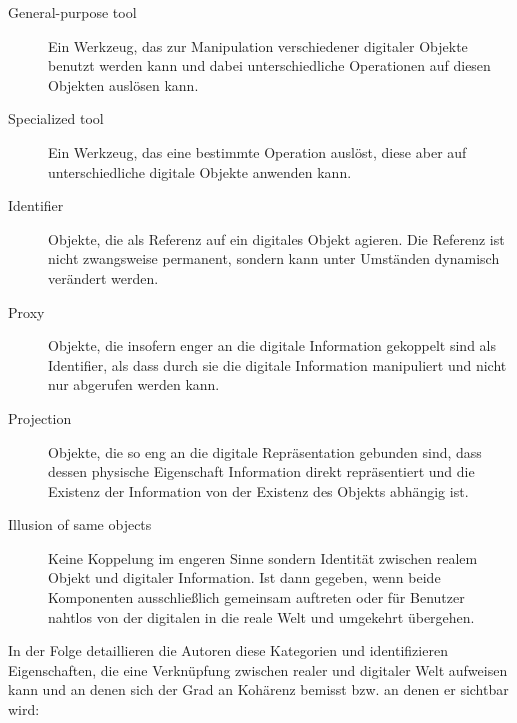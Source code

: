 \begin{description}
	\item[General-purpose tool] Ein Werkzeug, das zur Manipulation verschiedener digitaler Objekte benutzt werden kann und dabei unterschiedliche Operationen auf diesen Objekten auslösen kann.
	\item[Specialized tool] Ein Werkzeug, das eine bestimmte Operation auslöst, diese aber auf unterschiedliche digitale Objekte anwenden kann.
	\item[Identifier] Objekte, die als Referenz auf ein digitales Objekt agieren. Die Referenz ist nicht zwangsweise permanent, sondern kann unter Umständen dynamisch verändert werden.
	\item[Proxy] Objekte, die insofern enger an die digitale Information gekoppelt sind als Identifier, als dass durch sie die digitale Information manipuliert und nicht nur abgerufen werden kann. 
	\item[Projection] Objekte, die so eng an die digitale Repräsentation gebunden sind, dass dessen physische Eigenschaft Information direkt repräsentiert und die Existenz der Information von der Existenz des Objekts abhängig ist.
	\item[Illusion of same objects] Keine Koppelung im engeren Sinne sondern Identität zwischen realem Objekt und digitaler Information. Ist dann gegeben, wenn beide Komponenten ausschließlich gemeinsam auftreten oder für Benutzer nahtlos von der digitalen in die reale Welt und umgekehrt übergehen.
\end{description}

In der Folge detaillieren die Autoren diese Kategorien und identifizieren Eigenschaften, die eine Verknüpfung zwischen realer und digitaler Welt aufweisen kann und an denen sich der Grad an Kohärenz bemisst bzw. an denen er sichtbar wird:

